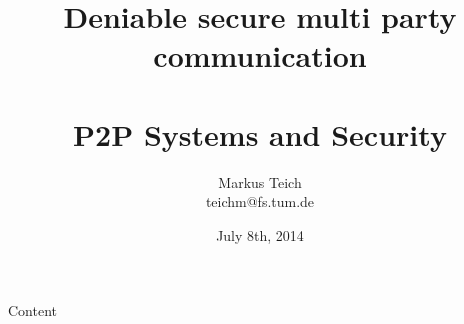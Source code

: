 

\title[Group OTR]{Deniable secure multi party communication\\\ \\\normalsize P2P Systems and Security}
\author[Markus Teich, Jannik Theiß]{Markus Teich\\\scriptsize teichm@fs.tum.de}
\date{July 8th, 2014}


\begin{frame}{}
    \titlepage
\end{frame}

\begin{frame}{Content}
    \tableofcontents
\end{frame}








